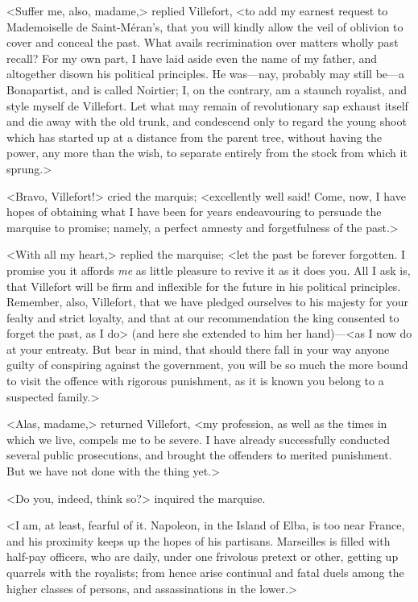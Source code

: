  <Suffer me, also, madame,> replied Villefort, <to add my earnest request to Mademoiselle de Saint-Méran's, that you will kindly allow the veil of oblivion to cover and conceal the past. What avails recrimination over matters wholly past recall? For my own part, I have laid aside even the name of my father, and altogether disown his political principles. He was—nay, probably may still be—a Bonapartist, and is called Noirtier; I, on the contrary, am a staunch royalist, and style myself de Villefort. Let what may remain of revolutionary sap exhaust itself and die away with the old trunk, and condescend only to regard the young shoot which has started up at a distance from the parent tree, without having the power, any more than the wish, to separate entirely from the stock from which it sprung.> 

 <Bravo, Villefort!> cried the marquis; <excellently well said! Come, now, I have hopes of obtaining what I have been for years endeavouring to persuade the marquise to promise; namely, a perfect amnesty and forgetfulness of the past.> 

 <With all my heart,> replied the marquise; <let the past be forever forgotten. I promise you it affords \textit{me} as little pleasure to revive it as it does you. All I ask is, that Villefort will be firm and inflexible for the future in his political principles. Remember, also, Villefort, that we have pledged ourselves to his majesty for your fealty and strict loyalty, and that at our recommendation the king consented to forget the past, as I do> (and here she extended to him her hand)—<as I now do at your entreaty. But bear in mind, that should there fall in your way anyone guilty of conspiring against the government, you will be so much the more bound to visit the offence with rigorous punishment, as it is known you belong to a suspected family.> 

 <Alas, madame,> returned Villefort, <my profession, as well as the times in which we live, compels me to be severe. I have already successfully conducted several public prosecutions, and brought the offenders to merited punishment. But we have not done with the thing yet.>  
 
 <Do you, indeed, think so?> inquired the marquise. 

 <I am, at least, fearful of it. Napoleon, in the Island of Elba, is too near France, and his proximity keeps up the hopes of his partisans. Marseilles is filled with half-pay officers, who are daily, under one frivolous pretext or other, getting up quarrels with the royalists; from hence arise continual and fatal duels among the higher classes of persons, and assassinations in the lower.> 

